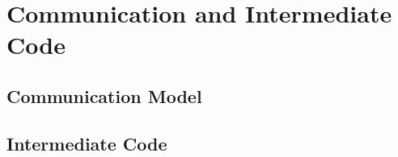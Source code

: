\section{Communication and Intermediate Code}
\label{sec:Communications_and_Intermediate_Code}


\subsection{Communication Model}
\label{sec:Communication_Model}


\subsection{Intermediate Code}
\label{sec:Intermediate_Code}
